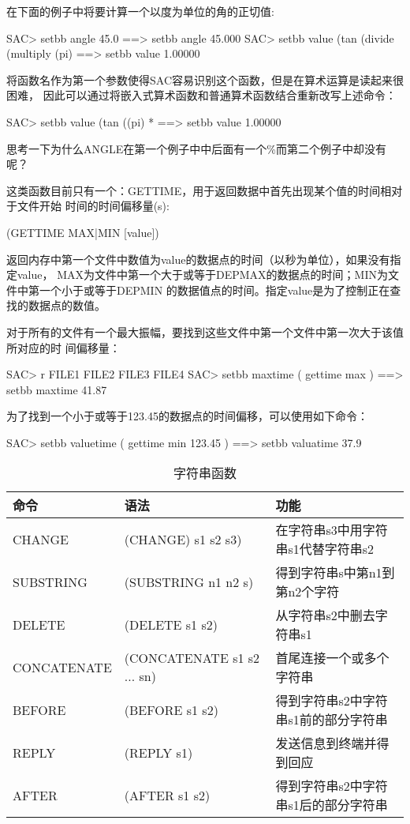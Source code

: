 在下面的例子中将要计算一个以度为单位的角的正切值:
\begin{SACCode}
SAC> setbb angle 45.0
 ==> setbb angle 45.000
SAC> setbb value (tan (divide (multiply (pi) %
 ==> setbb value 1.00000 
\end{SACCode}
将函数名作为第一个参数使得SAC容易识别这个函数，但是在算术运算是读起来很困难，
因此可以通过将嵌入式算术函数和普通算术函数结合重新改写上述命令：
\begin{SACCode}
SAC> setbb value (tan ((pi) * %
 ==> setbb value 1.00000 
\end{SACCode}
思考一下为什么ANGLE在第一个例子中中后面有一个\%而第二个例子中却没有呢？

这类函数目前只有一个：GETTIME，用于返回数据中首先出现某个值的时间相对于文件开始
时间的时间偏移量(s):
\begin{SACCode}
   (GETTIME MAX|MIN [value])
\end{SACCode}
返回内存中第一个文件中数值为value的数据点的时间（以秒为单位），如果没有指定value，
MAX为文件中第一个大于或等于DEPMAX的数据点的时间；MIN为文件中第一个小于或等于DEPMIN
的数据值点的时间。指定value是为了控制正在查找的数据点的数值。

对于所有的文件有一个最大振幅，要找到这些文件中第一个文件中第一次大于该值所对应的时
间偏移量：
\begin{SACCode}
SAC> r FILE1 FILE2 FILE3 FILE4
SAC> setbb maxtime ( gettime max )
 ==> setbb maxtime 41.87
\end{SACCode}

为了找到一个小于或等于123.45的数据点的时间偏移，可以使用如下命令：
\begin{SACCode}
SAC> setbb valuetime ( gettime min 123.45 )
 ==> setbb valuatime 37.9 
\end{SACCode}

\begin{table}[h]
\caption{字符串函数}
\centering
\begin{tabular}{p{2.73cm}p{4.88cm}p{7.1cm}}
	\toprule
	命令	&	语法	&	功能	\\
	\midrule
	CHANGE	&	(CHANGE) s1 s2 s3) 	&	在字符串s3中用字符串s1代替字符串s2	\\
	SUBSTRING&	(SUBSTRING n1 n2 s) &	得到字符串s中第n1到第n2个字符\\
	DELETE	&	(DELETE s1 s2)		&	从字符串s2中删去字符串s1	\\
	CONCATENATE&	(CONCATENATE s1 s2 ... sn)	&	首尾连接一个或多个字符串\\
	BEFORE	&	(BEFORE s1 s2)	&	得到字符串s2中字符串s1前的部分字符串\\
	REPLY	&	(REPLY s1)	&	发送信息到终端并得到回应	\\
	AFTER	&	(AFTER s1 s2)	&	得到字符串s2中字符串s1后的部分字符串\\
	\bottomrule
\end{tabular}
\end{table}


